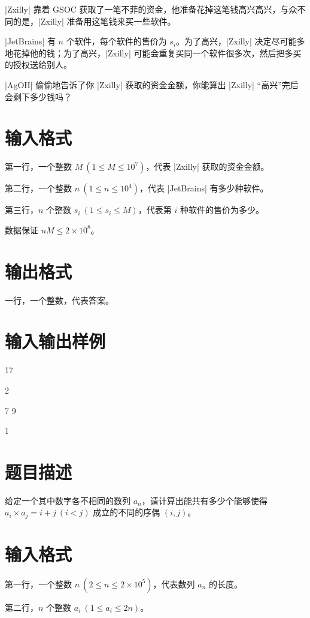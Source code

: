\documentclass{ctpro}
\begin{document}
|Zxilly| 靠着 GSOC 获取了一笔不菲的资金，他准备花掉这笔钱高兴高兴，与众不同的是，|Zxilly| 准备用这笔钱来买一些软件。

|JetBrains| 有 $n$ 个软件，每个软件的售价为 $s_i$。为了高兴，|Zxilly| 决定尽可能多地花掉他的钱；为了高兴，|Zxilly| 可能会重复买同一个软件很多次，然后把多买的授权送给别人。

|AgOH| 偷偷地告诉了你 |Zxilly| 获取的资金金额，你能算出 |Zxilly| “高兴”完后会剩下多少钱吗？

\section*{输入格式}

第一行，一个整数 $M~(1 \leq M \leq {10}^7)$，代表 |Zxilly| 获取的资金金额。

第二行，一个整数 $n~(1 \leq n \leq {10}^4)$，代表 |JetBrains| 有多少种软件。

第三行，$n$ 个整数 $s_i~(1 \leq s_i \leq M)$，代表第 $i$ 种软件的售价为多少。

数据保证 $nM \leq 2 \times {10}^8$。

\section*{输出格式}

一行，一个整数，代表答案。

\section*{输入输出样例}
\testcasetab
{
	17\par
	2\par
	7 9
}
{
	1
}

\makeproblem
\section*{题目描述}

给定一个其中数字各不相同的数列 ${a_n}$，请计算出能共有多少个能够使得 $a_i \times a_j = i+j~(i<j)$ 成立的不同的序偶 $(i,j)$。

\section*{输入格式}

第一行，一个整数 $n~(2 \leq n \leq 2 \times {10}^5)$，代表数列 ${a_n}$ 的长度。

第二行，$n$ 个整数 $a_i~(1 \leq a_i \leq 2n)$。
\end{document}
